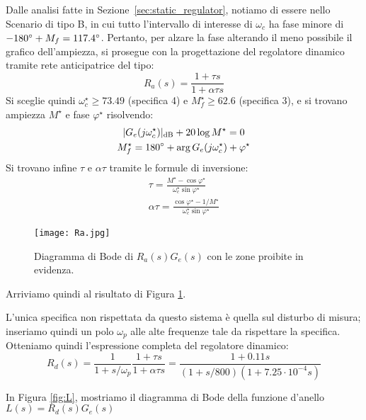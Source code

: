 \documentclass[a4paper, 11pt]{article}
\begin{document}
	Dalle analisi fatte in Sezione~\ref{sec:static_regulator}, notiamo di essere nello Scenario di tipo B, in cui tutto l'intervallo di interesse di $\omega_c$ ha fase minore di $-180\degree+M_f = 117.4\degree$.
	Pertanto, per alzare la fase alterando il meno possibile il grafico dell'ampiezza, si prosegue con la progettazione del regolatore dinamico tramite rete anticipatrice del tipo:
	\[
	R_a(s) = \frac{1+\tau s}{1+\alpha\tau s}
	\]
	Si sceglie quindi $\omega_c^\star \ge 73.49$ (specifica 4) e $M_f^\star \ge 62.6$ (specifica 3), e si trovano ampiezza $M^\star$ e fase $\varphi^\star$ risolvendo:
	\begin{subequations}
		\begin{gather}
			|G_e(j\omega_c^\star)|_{\text{dB}}+20\log M^\star = 0 \\
			M_f^\star = 180\degree + \arg G_e(j\omega_c^\star) + \varphi^\star
		\end{gather}	
	\end{subequations}
	Si trovano infine $\tau$ e $\alpha\tau$ tramite le formule di inversione:
	\begin{subequations}
		\begin{gather}
			\tau = \frac{M^\star-\cos\varphi^\star}{\omega_c^\star\sin\varphi^\star} \\
			\alpha\tau = \frac{\cos\varphi^\star-1/M^\star}{\omega_c^\star\sin\varphi^\star}
		\end{gather}
	\end{subequations}
	
	\begin{figure}[h]
		\centering
		\texttt{[image: Ra.jpg]}
		\caption{Diagramma di Bode di $R_a(s)G_e(s)$ con le zone proibite in evidenza.}
		\label{fig:Ra}
	\end{figure}
	
	Arriviamo quindi al risultato di Figura \ref{fig:Ra}.
	
	L'unica specifica non rispettata da questo sistema è quella sul disturbo di misura; inseriamo quindi un polo $\omega_p$ alle alte frequenze tale da rispettare la specifica. Otteniamo quindi l'espressione completa del regolatore dinamico:
	\begin{equation}
		R_d(s) = \frac{1}{1+s/\omega_p}\frac{1+\tau s}{1+\alpha\tau s} = \frac{1+0.11s}{(1+s/800)(1+7.25\cdot10^{-4}s)}
	\end{equation}
	
	In Figura \ref{fig:L}, mostriamo il diagramma di Bode della funzione d'anello $L(s) = R_d(s) G_e(s)$
	
\end{document}
